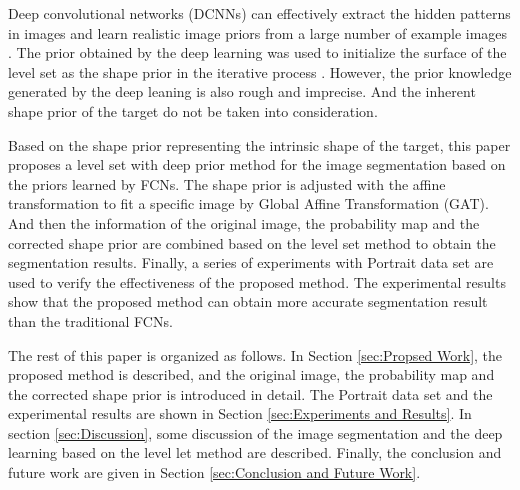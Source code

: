 Deep convolutional networks (DCNNs) can effectively extract the hidden patterns in images and learn realistic image priors from a large number of example images \cite{Introduction:FCN:prior:UlyanovVL17}. The prior obtained by the deep learning was used to initialize the surface of the level set as the shape prior in the iterative process \cite{Introduction:deep:LevelSet:hu2017deep, Introduction:deep:LevelSet:tang2017deep}. However, the prior knowledge generated by the deep leaning is also rough and imprecise. And the inherent shape prior of the target do not be taken into consideration.

Based on the shape prior representing the intrinsic shape of the target, this paper proposes a level set with deep prior method for the image segmentation based on the priors learned by FCNs. The shape prior is adjusted with the affine transformation to fit a specific image by Global Affine Transformation (GAT). And then the information of the original image, the probability map and the corrected shape prior are combined based on the level set method to obtain the segmentation results. Finally, a series of experiments with Portrait data set \cite{FCN:segmentation:shen2016automatic} are used to verify the effectiveness of the proposed method. The experimental results show that the proposed method can obtain more accurate segmentation result than the traditional FCNs.

The rest of this paper is organized as follows. In Section \ref{sec:Propsed Work}, the proposed method is described, and the original image, the probability map and the corrected shape prior is introduced in detail. The Portrait data set and the experimental results are shown in Section \ref{sec:Experiments and Results}. In section \ref{sec:Discussion}, some discussion of the image segmentation and the deep learning based on the level let method are described. Finally, the conclusion and future work are given in Section \ref{sec:Conclusion and Future Work}.
